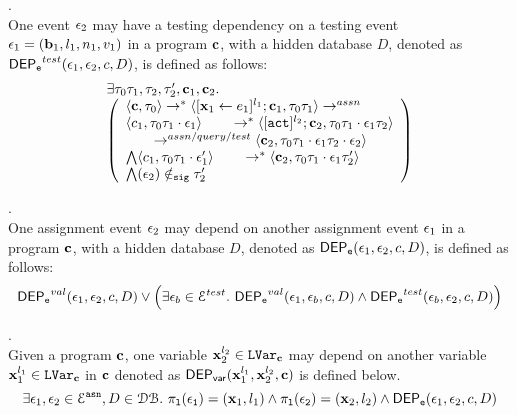 \begin{defn}
\label{def:event_testdep}.
\\
One event $\mathtt{\epsilon}_2$ may have a testing dependency on a testing event $\mathtt{\epsilon}_1 = ({\boldsymbol{\mathbf{b}}}_1, l_1, n_1, v_1)$
in a program ${\boldsymbol{\mathbf{c}}}$, with a hidden database $D$, 
denoted as 
%
$\mathsf{DEP_{\mathtt{e}}}^{test}(\mathtt{\epsilon}_1, \mathtt{\epsilon}_2, c, D)$, is defined as follows: 
%
\[
\begin{array}{l}
\exists \vtrace_0
\vtrace_1, \vtrace_2, \vtrace_2', \ssa{c}_1, \ssa{c}_2.
\\
  \left(
  \begin{array}{l}   
\config{\ssa{c}, \vtrace_0} \rightarrow^{*} 
\config{[\assign{\ssa{x}_1}{\expr_1}]^{l_1} ; \ssa{c}_1, \vtrace_0 \vtrace_1}  \rightarrow^{assn}
\\ 
 \config{c_1, \vtrace_0 \vtrace_1 \cdot \event_1} 
  \qquad \rightarrow^{*} 
  \config{[\action]^{l_2} ; \ssa{c}_2, \vtrace_0 \vtrace_1 \cdot \event_1\vtrace_2} 
  \\
  \qquad \rightarrow^{assn/query/test} 
  \config{\ssa{c}_2,  \vtrace_0 \vtrace_1 \cdot \event_1 \vtrace_2 \cdot \event_2} 
 \\ 
 \bigwedge
 \config{c_1, \vtrace_0 \vtrace_1 \cdot \event_1'} 
  \qquad \rightarrow^{*} 
  \config{\ssa{c}_2,  \vtrace_0 \vtrace_1 \cdot \event_1 \vtrace_2'} 
\\
\bigwedge
(\event_2) \notin_{\sig} \vtrace_2'
\end{array}
\right)
\end{array} 
 \]
%
\end{defn}
%
%
\begin{defn}.
\label{def:event_dep}
\\
One assignment event $\mathtt{\epsilon}_2$ may depend on another assignment event $\mathtt{\epsilon}_1$
in a program ${\boldsymbol{\mathbf{c}}}$, with a hidden database $D$, denoted as 
%
$\mathsf{DEP_{\mathtt{e}}}(\mathtt{\epsilon}_1, \mathtt{\epsilon}_2, c, D)$, is defined as follows: 
%
\[
\mathsf{DEP_{\mathtt{e}}}^{val}(\mathtt{\epsilon}_1, \mathtt{\epsilon}_2, c, D) 
\lor
\Big(
\exists \mathtt{\epsilon}_b \in \mathcal{E}^{test}. ~ \mathsf{DEP_{\mathtt{e}}}^{val}(\mathtt{\epsilon}_1, \mathtt{\epsilon}_b, c, D) 
\land \mathsf{DEP_{\mathtt{e}}}^{test}(\mathtt{\epsilon}_b, \mathtt{\epsilon}_2, c, D) 
\Big)
\] 
%
%
\end{defn}
%
\begin{defn}.
\label{def:var_dep}
\\
Given a program ${\boldsymbol{\mathbf{c}}}$, 
one variable ${\boldsymbol{\mathbf{x}}}_2^{l_2} \in \mathtt{LVar}_{{\boldsymbol{\mathbf{c}}}}$ may depend on another variable 
${\boldsymbol{\mathbf{x}}}_1^{l_1} \in \mathtt{LVar}_{{\boldsymbol{\mathbf{c}}}}$ in ${\boldsymbol{\mathbf{c}}}$ denoted as 
%
$\mathsf{DEP_{var}}({\boldsymbol{\mathbf{x}}}_1^{l_1}, {\boldsymbol{\mathbf{x}}}_2^{l_2}, {\boldsymbol{\mathbf{c}}})$ is defined below.
%
\[
\exists \mathtt{\epsilon}_1, \mathtt{\epsilon}_2 \in \mathcal{E}^{\mathtt{{asn}}}, D \in \mathcal{DB}. ~
\mathtt{\pi_{l}(\mathtt{\epsilon}_1)} = ({\boldsymbol{\mathbf{x}}}_1, l_1)
\land
\mathtt{\pi_{l}(\mathtt{\epsilon}_2)} = ({\boldsymbol{\mathbf{x}}}_2, l_2)
\land 
\mathsf{DEP_{\mathtt{e}}}(\mathtt{\epsilon}_1, \mathtt{\epsilon}_2, c, D)
\] 
%
%
\end{defn}
